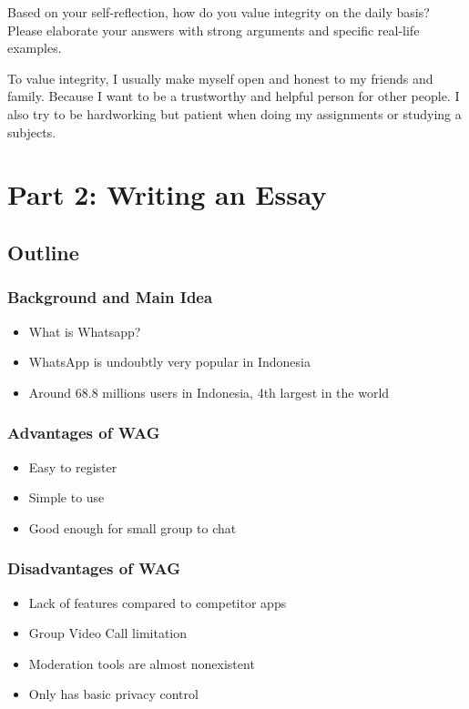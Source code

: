 \documentclass[
  12pt,
  answers  
]{exam}
\begin{document}
\begin{questions}
    \question
    Based on your self-reflection, how do you value integrity on the daily basis? Please elaborate your answers with strong arguments and specific real-life examples.
    \begin{solution}
        To value integrity, I usually make myself open and honest to my friends and family. Because I want to be a trustworthy and helpful person for other people. I also try to be hardworking but patient when doing my assignments or studying a subjects. 
    \end{solution}

    \end{questions}

    \pagebreak
    \section{Part 2: Writing an Essay}
    \subsection{Outline}
    \subsubsection{Background and Main Idea}
    \begin{itemize}
        \item What is Whatsapp?
        \item WhatsApp is undoubtly very popular in Indonesia
        \item Around 68.8 millions users in Indonesia, 4th largest in the world
    \end{itemize}
    \subsubsection{Advantages of WAG}
    \begin{itemize}
        \item Easy to register
        \item Simple to use
        \item Good enough for small group to chat
    \end{itemize}
    \subsubsection{Disadvantages of WAG} 
    \begin{itemize}
        \item Lack of features compared to competitor apps
        \item Group Video Call limitation
        \item Moderation tools are almost nonexistent
        \item Only has basic privacy control
    \end{itemize}
\end{document}
